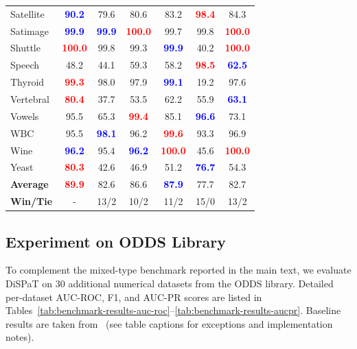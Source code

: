 \begin{table}[t]
\begin{tabular*}{\textwidth}{@{\extracolsep{\fill}}lcccccc@{}}
Satellite & \textcolor{blue}{\textbf{90.2}} & 79.6 & 80.6 & 83.2 & \textcolor{red}{\textbf{98.4}} & 84.3 \\
Satimage & \textcolor{blue}{\textbf{99.9}} & \textcolor{blue}{\textbf{99.9}} & \textcolor{red}{\textbf{100.0}} & 99.7 & 99.8 & \textcolor{red}{\textbf{100.0}} \\
Shuttle & \textcolor{red}{\textbf{100.0}} & 99.8 & 99.3 & \textcolor{blue}{\textbf{99.9}} & 40.2 & \textcolor{red}{\textbf{100.0}} \\
Speech & 48.2 & 44.1 & 59.3 & 58.2 & \textcolor{red}{\textbf{98.5}} & \textcolor{blue}{\textbf{62.5}} \\
Thyroid & \textcolor{red}{\textbf{99.3}} & 98.0 & 97.9 & \textcolor{blue}{\textbf{99.1}} & 19.2 & 97.6 \\
Vertebral & \textcolor{red}{\textbf{80.4}} & 37.7 & 53.5 & 62.2 & 55.9 & \textcolor{blue}{\textbf{63.1}} \\
Vowels & 95.5 & 65.3 & \textcolor{red}{\textbf{99.4}} & 85.1 & \textcolor{blue}{\textbf{96.6}} & 73.1 \\
WBC & 95.5 & \textcolor{blue}{\textbf{98.1}} & 96.2 & \textcolor{red}{\textbf{99.6}} & 93.3 & 96.9 \\
Wine & \textcolor{blue}{\textbf{96.2}} & 95.4 & \textcolor{blue}{\textbf{96.2}} & \textcolor{red}{\textbf{100.0}} & 45.6 & \textcolor{red}{\textbf{100.0}} \\
Yeast & \textcolor{red}{\textbf{80.3}} & 42.6 & 46.9 & 51.2 & \textcolor{blue}{\textbf{76.7}} & 54.3 \\
\midrule
\textbf{Average} & \textcolor{red}{\textbf{89.9}} & 82.6 & 86.6 & \textcolor{blue}{\textbf{87.9}} & 77.7 & 82.7 \\
\textbf{Win/Tie} & - & 13/2 & 10/2 & 11/2 & 15/0 & 13/2 \\
\bottomrule
\end{tabular*}
\end{table}

\subsection{Experiment on ODDS Library} \label{sec:app:oods_result}

To complement the mixed-type benchmark reported in the main text, we evaluate DiSPaT 
on 30 additional numerical datasets from the ODDS library. Detailed per-dataset 
AUC-ROC, F1, and AUC-PR scores are listed in Tables~\ref{tab:benchmark-results-auc-roc}--\ref{tab:benchmark-results-aucpr}. 
Baseline results are taken from~\citep{tsai2025anollm} (see table captions for exceptions and implementation notes).

